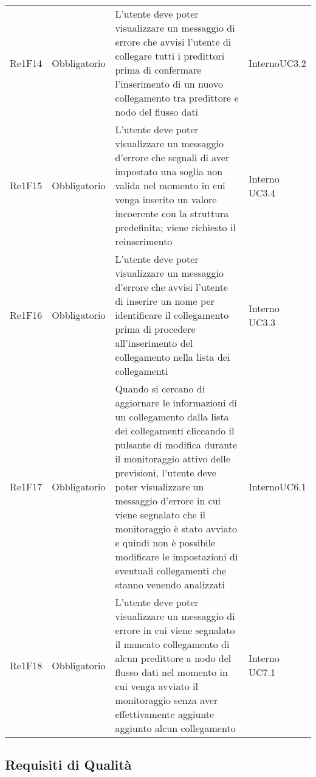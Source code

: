 \begin{longtable}{C{3cm} C{3cm} L{6.5cm} C{2.5cm}}
Re1F14 & Obbligatorio & L'utente deve poter visualizzare un messaggio di errore che avvisi l'utente di collegare tutti i predittori prima di confermare l'inserimento di un nuovo collegamento tra predittore e nodo del flusso dati &  Interno\newline UC3.2\\
Re1F15 & Obbligatorio & L'utente deve poter visualizzare un messaggio d'errore che segnali di aver impostato una soglia non valida nel momento in cui venga inserito un valore incoerente con la struttura predefinita; viene richiesto il reinserimento & Interno\newline
UC3.4\\
Re1F16 & Obbligatorio & L'utente deve poter visualizzare un messaggio d'errore che avvisi l'utente di inserire un nome per identificare il collegamento prima di procedere all'inserimento del collegamento nella lista dei collegamenti & Interno\newline
UC3.3\\
Re1F17 & Obbligatorio & Quando si cercano di aggiornare le informazioni di un collegamento dalla lista dei collegamenti cliccando il pulsante di modifica durante il monitoraggio attivo delle previsioni, l'utente deve poter visualizzare un messaggio d'errore in cui viene segnalato che il monitoraggio è stato avviato e quindi non è possibile modificare le impostazioni di eventuali collegamenti che stanno venendo analizzati & Interno\newline UC6.1\\
Re1F18 & Obbligatorio & L'utente deve poter visualizzare un messaggio di errore in cui viene segnalato il mancato collegamento di alcun predittore a nodo del flusso dati nel momento in cui venga avviato il monitoraggio senza aver effettivamente aggiunte aggiunto alcun collegamento &  Interno\newline
UC7.1\\

\end{longtable}


\pagebreak
 	\subsection{Requisiti di Qualità}

